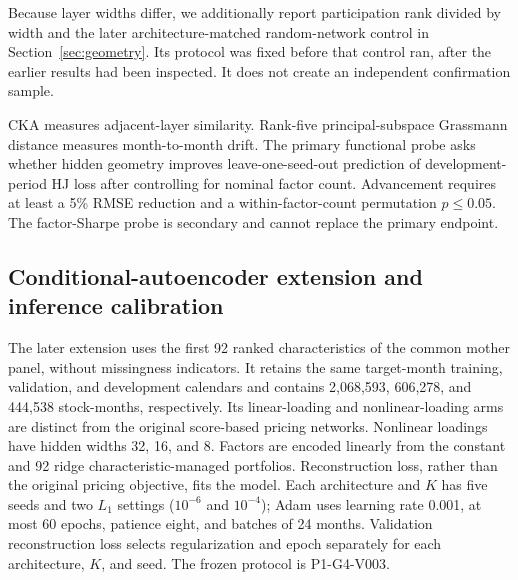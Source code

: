 Because layer widths differ, we additionally report participation rank divided by width and the later architecture-matched random-network control in Section~\ref{sec:geometry}. Its protocol was fixed before that control ran, after the earlier results had been inspected. It does not create an independent confirmation sample.

CKA measures adjacent-layer similarity. Rank-five principal-subspace Grassmann distance measures month-to-month drift. The primary functional probe asks whether hidden geometry improves leave-one-seed-out prediction of development-period HJ loss after controlling for nominal factor count. Advancement requires at least a 5\% RMSE reduction and a within-factor-count permutation $p\leq0.05$. The factor-Sharpe probe is secondary and cannot replace the primary endpoint.

\subsection{Conditional-autoencoder extension and inference calibration}

The later extension uses the first 92 ranked characteristics of the common mother panel, without missingness indicators. It retains the same target-month training, validation, and development calendars and contains 2,068,593, 606,278, and 444,538 stock-months, respectively. Its linear-loading and nonlinear-loading arms are distinct from the original score-based pricing networks. Nonlinear loadings have hidden widths 32, 16, and 8. Factors are encoded linearly from the constant and 92 ridge characteristic-managed portfolios. Reconstruction loss, rather than the original pricing objective, fits the model. Each architecture and $K$ has five seeds and two $L_1$ settings ($10^{-6}$ and $10^{-4}$); Adam uses learning rate 0.001, at most 60 epochs, patience eight, and batches of 24 months. Validation reconstruction loss selects regularization and epoch separately for each architecture, $K$, and seed. The frozen protocol is P1-G4-V003.

